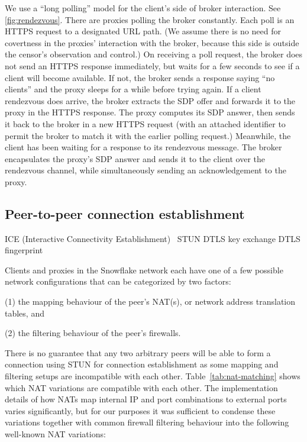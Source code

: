 \documentclass[letterpaper,twocolumn]{article}
\begin{document}
We use a ``long polling'' model for the client's side of broker interaction.
See \autoref{fig:rendezvous}.
There are proxies polling the broker constantly.
Each poll is an HTTPS request to a designated URL path.
(We assume there is no need for covertness
in the proxies' interaction with the broker,
because this side is outside the censor's observation and control.)
On receiving a poll request,
the broker does not send an HTTPS response immediately,
but waits for a few seconds to see if a client will become available.
If not, the broker sends a response saying ``no clients''
and the proxy sleeps for a while before trying again.
If a client rendezvous does arrive,
the broker extracts the SDP offer and forwards it to the proxy
in the HTTPS response.
The proxy computes its SDP answer,
then sends it back to the broker in a new HTTPS request
(with an attached identifier to permit the broker to match it
with the earlier polling request.)
Meanwhile, the client has been waiting for a response
to its rendezvous message.
The broker encapsulates the proxy's SDP answer
and sends it to the client over the rendezvous channel,
while simultaneously sending an acknowledgement to the proxy.

\subsection{Peer-to-peer connection establishment}
\label{sec:ice}

ICE (Interactive Connectivity Establishment)~\cite{rfc8445}
STUN
DTLS
key exchange
DTLS fingerprint~\cite[\S 5]{rfc8842}

Clients and proxies in the Snowflake network each have one of a few possible
network configurations that can be categorized by two factors:

(1) the mapping behaviour of
the peer's NAT(s), or network address translation tables, and

(2) the filtering behaviour of the peer's firewalls.

There is no guarantee that any two arbitrary peers will be able to form
a connection using STUN for connection establishment as some mapping and
filtering setups are incompatible with each other. Table~\ref{tab:nat-matching} shows
which NAT variations are compatible with each other.
The implementation details of how NATs map internal IP and port combinations
to external ports varies significantly, but for our purposes it was sufficient
to condense these variations together with common firewall filtering behaviour
into the following well-known NAT variations:
\end{document}
